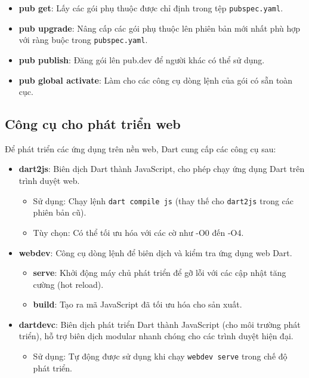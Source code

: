 \documentclass[../DoAn.tex]{subfiles}
\numberwithin{figure}{chapter}
\begin{document}
\begin{itemize}
\begin{itemize}
    \begin{itemize}
        \item \textbf{pub get}: Lấy các gói phụ thuộc được chỉ định trong tệp \texttt{pubspec.yaml}.
        \item \textbf{pub upgrade}: Nâng cấp các gói phụ thuộc lên phiên bản mới nhất phù hợp với ràng buộc trong \texttt{pubspec.yaml}.
        \item \textbf{pub publish}: Đăng gói lên pub.dev để người khác có thể sử dụng.
        \item \textbf{pub global activate}: Làm cho các công cụ dòng lệnh của gói có sẵn toàn cục.
    \end{itemize}
\end{itemize}

\subsection{Công cụ cho phát triển web}

Để phát triển các ứng dụng trên nền web, Dart cung cấp các công cụ sau:

\begin{itemize}
    \item \textbf{dart2js}: Biên dịch Dart thành JavaScript, cho phép chạy ứng dụng Dart trên trình duyệt web.
    \begin{itemize}
        \item Sử dụng: Chạy lệnh \texttt{dart compile js} (thay thế cho \texttt{dart2js} trong các phiên bản cũ).
        \item Tùy chọn: Có thể tối ưu hóa với các cờ như -O0 đến -O4.
    \end{itemize}
    \item \textbf{webdev}: Công cụ dòng lệnh để biên dịch và kiểm tra ứng dụng web Dart.
    \begin{itemize}
        \item \textbf{serve}: Khởi động máy chủ phát triển để gỡ lỗi với các cập nhật tăng cường (hot reload).
        \item \textbf{build}: Tạo ra mã JavaScript đã tối ưu hóa cho sản xuất.
    \end{itemize}
    \item \textbf{dartdevc}: Biên dịch phát triển Dart thành JavaScript (cho môi trường phát triển), hỗ trợ biên dịch modular nhanh chóng cho các trình duyệt hiện đại.
    \begin{itemize}
        \item Sử dụng: Tự động được sử dụng khi chạy \texttt{webdev serve} trong chế độ phát triển.
    \end{itemize}
\end{itemize}


\end{itemize}
\end{document}
